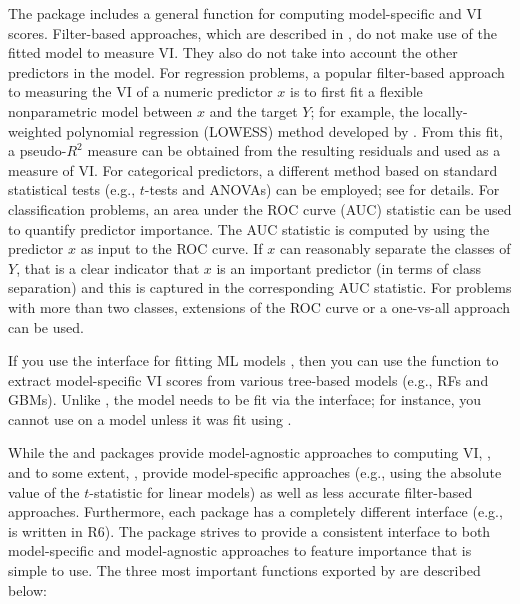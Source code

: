 The  package \citep{R-caret} includes a general
 function for computing model-specific and
 VI scores. Filter-based approaches, which are
described in \citet{applied-kuhn-2013}, do not make use of the fitted
model to measure VI. They also do not take into account the other
predictors in the model. For regression problems, a popular filter-based
approach to measuring the VI of a numeric predictor \(x\) is to first
fit a flexible nonparametric model between \(x\) and the target \(Y\);
for example, the locally-weighted polynomial regression (LOWESS) method
developed by \citet{robust-cleveland-1979}. From this fit, a
pseudo-\(R^2\) measure can be obtained from the resulting residuals and
used as a measure of VI. For categorical predictors, a different method
based on standard statistical tests (e.g., \(t\)-tests and ANOVAs) can
be employed; see \citet{applied-kuhn-2013} for details. For
classification problems, an area under the ROC curve (AUC) statistic can
be used to quantify predictor importance. The AUC statistic is computed
by using the predictor \(x\) as input to the ROC curve. If \(x\) can
reasonably separate the classes of \(Y\), that is a clear indicator that
\(x\) is an important predictor (in terms of class separation) and this
is captured in the corresponding AUC statistic. For problems with more
than two classes, extensions of the ROC curve or a one-vs-all approach
can be used.

If you use the  interface for fitting ML models
\citep{R-mlr}, then you can use the 
function to extract model-specific VI scores from various tree-based
models (e.g., RFs and GBMs). Unlike , the model needs to be
fit via the  interface; for instance, you cannot use
 on a  \citep{R-ranger}
model unless it was fit using .

While the  and  packages provide model-agnostic
approaches to computing VI, , and to some extent, ,
provide model-specific approaches (e.g., using the absolute value of the
\(t\)-statistic for linear models) as well as less accurate filter-based
approaches. Furthermore, each package has a completely different
interface (e.g.,  is written in R6). The  package
\citep{R-vip} strives to provide a consistent interface to both
model-specific and model-agnostic approaches to feature importance that
is simple to use. The three most important functions exported by
 are described below:

